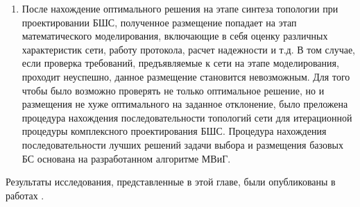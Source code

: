 \begin{enumerate}
  \item После нахождение оптимального решения на этапе синтеза топологии при проектировании БШС, полученное размещение попадает на этап математического моделирования, включающие в себя оценку различных характеристик сети, работу протокола, расчет надежности и т.д. В том случае, если проверка требований, предъявляемые к сети на этапе моделирования, проходит неуспешно, данное размещение становится невозможным. Для того чтобы  было возможно проверять не только оптимальное решение, но и размещения не хуже оптимального на заданное отклонение, было преложена процедура нахождения последовательности топологий сети для итерационной процедуры комплексного проектирования БШС. Процедура нахождения последовательности лучших решений задачи выбора и размещения базовых БС основана на разработанном алгоритме МВиГ.
  
\end{enumerate}



Результаты исследования, представленные в этой главе, были опубликованы в работах \cite{IvanovVAK2019, Ivanov2019, MukhtarovIvanovPershinDCCN2019_RSCI, Mukhtarov2020, VishnevskyMukhtarovPershinDCCN2020_RSCI, LazarevaLarionovMukhtarovITTMM2020_RSCI, VishnevskyLarionovMukhtarovICAM2020_RSCI, MukhtarovSokolovITTMM2021, PershinVAK2022, Larionov2021}.







